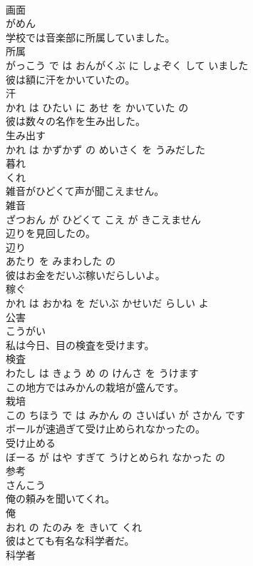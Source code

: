 \documentclass[8pt]{extreport}
\begin{document}
\begin{CJK}{UTF8}{min}
\\	画面	
\\	がめん		
\\	学校では音楽部に所属していました。	
\\	所属 
\\	がっこう で は おんがくぶ に しょぞく して いました			
\\	彼は額に汗をかいていたの。	
\\	汗 
\\	かれ は ひたい に あせ を かいていた の			
\\	彼は数々の名作を生み出した。	
\\	生み出す 
\\	かれ は かずかず の めいさく を うみだした			
\\	暮れ	
\\	くれ		
\\	雑音がひどくて声が聞こえません。	
\\	雑音 
\\	ざつおん が ひどくて こえ が きこえません			
\\	辺りを見回したの。	
\\	辺り 
\\	あたり を みまわした の			
\\	彼はお金をだいぶ稼いだらしいよ。	
\\	稼ぐ 
\\	かれ は おかね を だいぶ かせいだ らしい よ			
\\	公害	
\\	こうがい		
\\	私は今日、目の検査を受けます。	
\\	検査 
\\	わたし は きょう め の けんさ を うけます			
\\	この地方ではみかんの栽培が盛んです。	
\\	栽培 
\\	この ちほう で は みかん の さいばい が さかん です			
\\	ボールが速過ぎて受け止められなかったの。	
\\	受け止める 
\\	ぼーる が はや すぎて うけとめられ なかった の			
\\	参考	
\\	さんこう		
\\	俺の頼みを聞いてくれ。	
\\	俺 
\\	おれ の たのみ を きいて くれ			
\\	彼はとても有名な科学者だ。	
\\	科学者 

\end{CJK}
\end{document}
